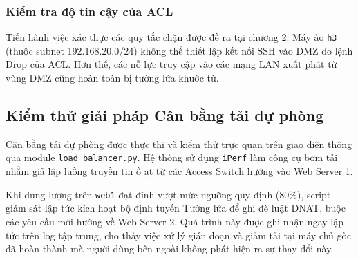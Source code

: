 \subsubsection{Kiểm tra độ tin cậy của ACL}
Tiến hành việc xác thực các quy tắc chặn được đề ra tại chương 2. Máy ảo \texttt{h3} (thuộc subnet 192.168.20.0/24) không thể thiết lập kết nối SSH vào DMZ do lệnh Drop của ACL. Hơn thế, các nỗ lực truy cập vào các mạng LAN xuất phát từ vùng DMZ cũng hoàn toàn bị tường lửa khước từ.


\subsection{Kiểm thử giải pháp Cân bằng tải dự phòng}
Cân bằng tải dự phòng được thực thi và kiểm thử trực quan trên giao diện thông qua module \texttt{load\_balancer.py}. Hệ thống sử dụng \texttt{iPerf} làm công cụ bơm tải nhằm giả lập luồng truyền tin ồ ạt từ các Access Switch hướng vào Web Server 1. 


Khi dung lượng trên \texttt{web1} đạt đỉnh vượt mức ngưỡng quy định (80\%), script giám sát lập tức kích hoạt bộ định tuyến Tường lửa để ghi đè luật DNAT, buộc các yêu cầu mới hướng về Web Server 2. Quá trình này được ghi nhận ngay lập tức trên log tập trung, cho thấy việc xử lý gián đoạn và giảm tải tại máy chủ gốc đã hoàn thành mà người dùng bên ngoài không phát hiện ra sự thay đổi này.
